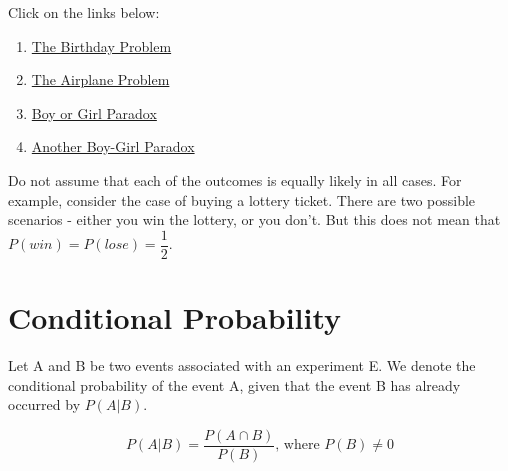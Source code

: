 \begin{note}\end{note}
Click on the links below: \\ 
\begin{enumerate}
    \item \href{https://www.youtube.com/watch?v=KtT_cgMzHx8}{The Birthday Problem}
    \item \href{https://www.youtube.com/watch?v=TAD3iC49v-Q}{The Airplane Problem}
    \item \href{https://en.wikipedia.org/wiki/Boy_or_Girl_paradox}{Boy or Girl Paradox}
    \item \href{https://stats.stackexchange.com/questions/93830/expected-number-of-ratio-of-girls-vs-boys-birth}{Another Boy-Girl Paradox}
\end{enumerate}


\begin{note}\end{note}
Do not assume that each of the outcomes is equally likely in all cases. For example, consider the case of buying a lottery ticket. There are two possible scenarios - either you win the lottery, or you don't. But this does not mean that $P(win) = P(lose) = \dfrac{1}{2}$.


\section{Conditional Probability}

\begin{definition}
Let A and B be two events associated with an experiment E. We denote the conditional probability of the event A, given that the event B has already occurred by $P(A | B)$.
\end{definition}

\begin{note}\end{note}
$$
P(A|B) = \dfrac{P(A \cap B)}{P(B)} \text{, where } P(B) \neq 0
$$




